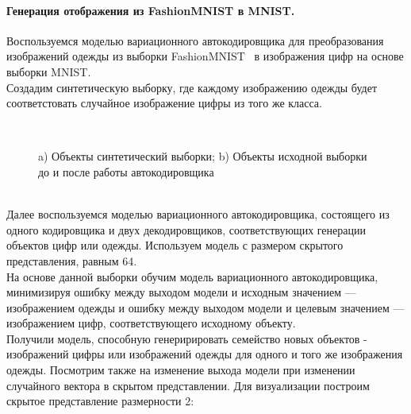 \paragraph{Генерация отображения из FashionMNIST в MNIST.}
Воспользуемся моделью вариационного автокодировщика для преобразования изображений одежды из выборки FashionMNIST~\cite{FMNIST} в изображения цифр на основе выборки MNIST.\\
Создадим синтетическую выборку, где каждому изображению одежды будет соответстовать случайное изображение цифры из того же класса.\\
\begin{figure}[h!t]\center
{}
\qquad
{}\\
\caption{a) Объекты синтетический выборки; b) Объекты исходной выборки до и после работы автокодировщика}
\end{figure}\\
Далее воспользуемся моделью вариационного автокодировщика, состоящего из одного кодировщика и двух декодировщиков, соответствующих генерации объектов цифр или одежды. Используем модель с размером скрытого представления, равным 64.\\
На основе данной выборки обучим модель вариационного автокодировщика, минимизируя ошибку между выходом модели и исходным значением --- изображением одежды и ошибку между выходом модели и целевым значением --- изображением цифр, соответствующего исходному объекту.\\
Получили модель, способную генеририровать семейство новых объектов - изображений цифры или изображений одежды для одного и того же изображения одежды.
\newpage
Посмотрим также на изменение выхода модели при изменении случайного вектора в скрытом представлении. Для визуализации построим скрытое представление размерности 2:\\

